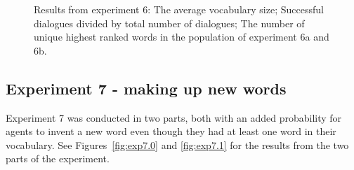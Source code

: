 \begin{figure}
    \centering
    \ContinuedFloat
    \hfill
    \par \bigskip
    \caption{Results from experiment 6:  The average vocabulary size;  Successful dialogues divided by total number of dialogues;  The number of unique highest ranked words in the population of experiment 6a and 6b.}
    \label{fig:exp6.1}
\end{figure}

\clearpage
\subsection{Experiment 7 - making up new words}
Experiment 7 was conducted in two parts, both with an added probability for agents to invent a new word even though they had at least one word in their vocabulary. See Figures~\ref{fig:exp7.0} and \ref{fig:exp7.1} for the results from the two parts of the experiment.

